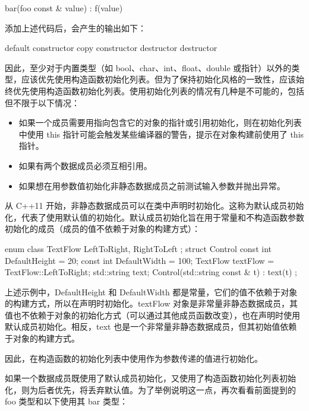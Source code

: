 \begin{cpp}
bar(foo const & value) : f(value) { }
\end{cpp}

添加上述代码后，会产生的输出如下：

\begin{shell}
default constructor
copy constructor
destructor
destructor
\end{shell}

因此，至少对于内置类型（如 bool、char、int、float、double 或指针）以外的类型，应该优先使用构造函数初始化列表。但为了保持初始化风格的一致性，应该始终优先使用构造函数初始化列表。使用初始化列表的情况有几种是不可能的，包括但不限于以下情况：

\begin{itemize}
\item
如果一个成员需要用指向包含它的对象的指针或引用初始化，则在初始化列表中使用 this 指针可能会触发某些编译器的警告，提示在对象构建前使用了 this 指针。

\item
如果有两个数据成员必须互相引用。

\item
如果想在用参数值初始化非静态数据成员之前测试输入参数并抛出异常。
\end{itemize}

从 C++11 开始，非静态数据成员可以在类中声明时初始化。这称为默认成员初始化，代表了使用默认值的初始化。默认成员初始化旨在用于常量和不构造函数参数初始化的成员（成员的值不依赖于对象的构建方式）：

\begin{cpp}
enum class TextFlow { LeftToRight, RightToLeft };
struct Control
{
    const int DefaultHeight = 20;
    const int DefaultWidth = 100;
    TextFlow textFlow = TextFlow::LeftToRight;
    std::string text;
    Control(std::string const & t) : text(t)
    {}
};
\end{cpp}

上述示例中，DefaultHeight 和 DefaultWidth 都是常量，它们的值不依赖于对象的构建方式，所以在声明时初始化。textFlow 对象是非常量非静态数据成员，其值也不依赖于对象的初始化方式（可以通过其他成员函数改变），也在声明时使用默认成员初始化。相反，text 也是一个非常量非静态数据成员，但其初始值依赖于对象的构建方式。

因此，在构造函数的初始化列表中使用作为参数传递的值进行初始化。

如果一个数据成员既使用了默认成员初始化，又使用了构造函数初始化列表初始化，则为后者优先，将丢弃默认值。为了举例说明这一点，再次看看前面提到的 foo 类型和以下使用其 bar 类型：

